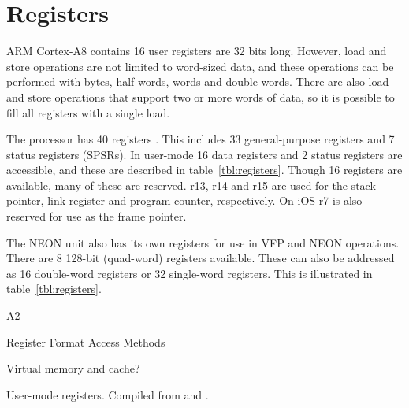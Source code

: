 \documentclass[oneside,a4paper]{report}
\begin{document}
\chapter{Registers}

ARM Cortex-A8 contains 16 user registers are 32 bits long. However, load and store operations are not limited to word-sized data, and these operations can be performed with bytes, half-words, words and double-words. There are also load and store operations that support two or more words of data, so it is possible to fill all registers with a single load.

The processor has 40 registers \cite[p. 2-18]{A8Ref}. This includes 33 general-purpose registers and 7 status registers (SPSRs). In user-mode 16 data registers and 2 status registers are accessible, and these are described in table~\ref{tbl:registers}. Though 16 registers are available, many of these are reserved. r13, r14 and r15 are used for the stack pointer, link register and program counter, respectively. On iOS r7 is also reserved for use as the frame pointer.

The NEON unit also has its own registers for use in VFP and NEON operations. There are 8 128-bit (quad-word) registers available. These can also be addressed as 16 double-word registers or 32 single-word registers. This is illustrated in table~\ref{tbl:registers}.

A2

Register Format
Access Methods

Virtual memory and cache?


\begin{table}[p]
	\centering
	
	\caption{User-mode registers. Compiled from \cite[p. 15]{AAPCS} and \cite[p. 14--15]{iOSABI}.}
	\label{tbl:registers}
\end{table}
\end{document}
